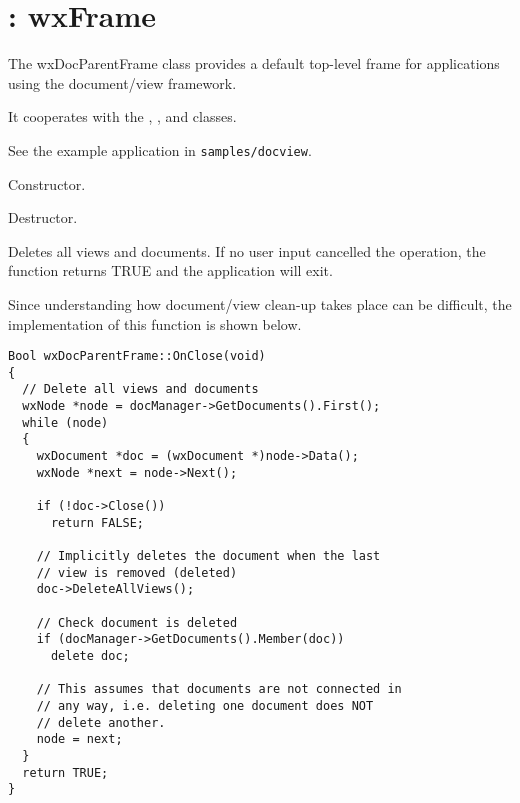 \section{: wxFrame}\label{wxdocparentframe}


The wxDocParentFrame class provides a default top-level frame for
applications using the document/view framework.

It cooperates with the , ,
\rtfsp{} and  classes.

See the example application in {\tt samples/docview}.



Constructor.



Destructor.



Deletes all views and documents. If no user input cancelled the
operation, the function returns TRUE and the application will exit.

Since understanding how document/view clean-up takes place can be difficult,
the implementation of this function is shown below.

\begin{verbatim}
Bool wxDocParentFrame::OnClose(void)
{
  // Delete all views and documents
  wxNode *node = docManager->GetDocuments().First();
  while (node)
  {
    wxDocument *doc = (wxDocument *)node->Data();
    wxNode *next = node->Next();

    if (!doc->Close())
      return FALSE;

    // Implicitly deletes the document when the last
    // view is removed (deleted)
    doc->DeleteAllViews();

    // Check document is deleted
    if (docManager->GetDocuments().Member(doc))
      delete doc;

    // This assumes that documents are not connected in
    // any way, i.e. deleting one document does NOT
    // delete another.
    node = next;
  }
  return TRUE;
}
\end{verbatim}

